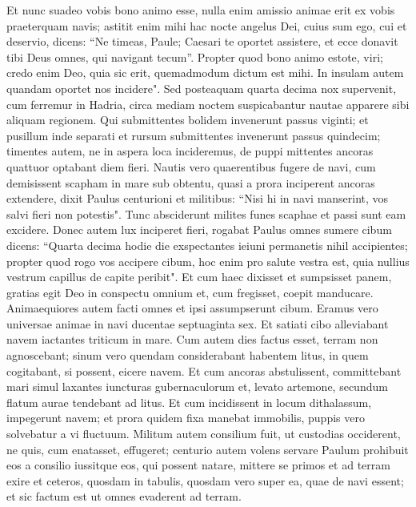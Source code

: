 \begin{biblechapter}
\verse Et nunc suadeo vobis bono animo esse, nulla enim amissio animae erit ex vobis praeterquam navis; 
\verse astitit enim mihi hac nocte angelus Dei, cuius sum ego, cui et deservio, 
\verse dicens: “Ne timeas, Paule; Caesari te oportet assistere, et ecce donavit tibi Deus omnes, qui navigant tecum”. 
\verse Propter quod bono animo estote, viri; credo enim Deo, quia sic erit, quemadmodum dictum est mihi. 
\verse In insulam autem quandam oportet nos incidere". 
\verse Sed posteaquam quarta decima nox supervenit, cum ferremur in Hadria, circa mediam noctem suspicabantur nautae apparere sibi aliquam regionem. 
\verse Qui submittentes bolidem invenerunt passus viginti; et pusillum inde separati et rursum submittentes invenerunt passus quindecim; 
\verse timentes autem, ne in aspera loca incideremus, de puppi mittentes ancoras quattuor optabant diem fieri. 
\verse Nautis vero quaerentibus fugere de navi, cum demisissent scapham in mare sub obtentu, quasi a prora inciperent ancoras extendere, 
\verse dixit Paulus centurioni et militibus: “Nisi hi in navi manserint, vos salvi fieri non potestis". 
\verse Tunc absciderunt milites funes scaphae et passi sunt eam excidere. 
\verse Donec autem lux inciperet fieri, rogabat Paulus omnes sumere cibum dicens: “Quarta decima hodie die exspectantes ieiuni permanetis nihil accipientes; 
\verse propter quod rogo vos accipere cibum, hoc enim pro salute vestra est, quia nullius vestrum capillus de capite peribit". 
\verse Et cum haec dixisset et sumpsisset panem, gratias egit Deo in conspectu omnium et, cum fregisset, coepit manducare. 
\verse Animaequiores autem facti omnes et ipsi assumpserunt cibum.  
\verse Eramus vero universae animae in navi ducentae septuaginta sex. 
\verse Et satiati cibo alleviabant navem iactantes triticum in mare. 
\verse Cum autem dies factus esset, terram non agnoscebant; sinum vero quendam considerabant habentem litus, in quem cogitabant, si possent, eicere navem.  
\verse Et cum ancoras abstulissent, committebant mari simul laxantes iuncturas gubernaculorum et, levato artemone, secundum flatum aurae tendebant ad litus.  
\verse Et cum incidissent in locum dithalassum, impegerunt navem; et prora quidem fixa manebat immobilis, puppis vero solvebatur a vi fluctuum. 
\verse Militum autem consilium fuit, ut custodias occiderent, ne quis, cum enatasset, effugeret; 
\verse centurio autem volens servare Paulum prohibuit eos a consilio iussitque eos, qui possent natare, mittere se primos et ad terram exire 
\verse et ceteros, quosdam in tabulis, quosdam vero super ea, quae de navi essent; et sic factum est ut omnes evaderent ad terram. 
\end{biblechapter}


